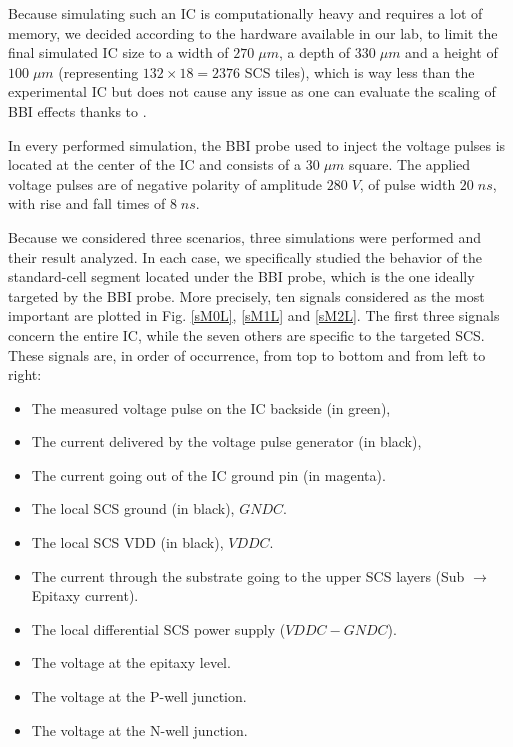 \documentclass[10pt, conference, compsocconf]{IEEEtran}
\begin{document}
Because simulating such an IC is computationally heavy and requires a lot of memory, we decided according to the hardware available in our lab, to limit the final simulated IC size to a width of $270 \; \mu m$, a depth of $330 \; \mu m$ and a height of $100 \; \mu m$ (representing $132 \times 18 = 2376$ SCS tiles), which is way less than the experimental IC but does not cause any issue as one can evaluate the scaling of BBI effects thanks to \cite{mybbi1}.

In every performed simulation, the BBI probe used to inject the voltage pulses is located at the center of the IC and consists of a $30 \; \mu m$ square.
The applied voltage pulses are of negative polarity of amplitude $280 \; V$, of pulse width $20 \; ns$, with rise and fall times of $8 \; ns$.

Because we considered three scenarios, three simulations were performed and their result analyzed.
In each case, we specifically studied the behavior of the standard-cell segment located under the BBI probe, which is the one ideally targeted by the BBI probe.
More precisely, ten signals considered as the most important are plotted in Fig. \ref{sM0L}, \ref{sM1L} and \ref{sM2L}.
The first three signals concern the entire IC, while the seven others are specific to the targeted SCS.
These signals are, in order of occurrence, from top to bottom and from left to right:
\begin{itemize}
    \item The measured voltage pulse on the IC backside (in green),
    \item The current delivered by the voltage pulse generator (in black),
    \item The current going out of the IC ground pin (in magenta).
    \item The local SCS ground (in black), $GNDC$.
    \item The local SCS VDD (in black), $VDDC$.
    \item The current through the substrate going to the upper SCS layers (Sub $\rightarrow$ Epitaxy current).
    \item The local differential SCS power supply ($VDDC - GNDC$).
    \item The voltage at the epitaxy level.
    \item The voltage at the P-well junction.
    \item The voltage at the N-well junction.
\end{itemize}

\end{document}
